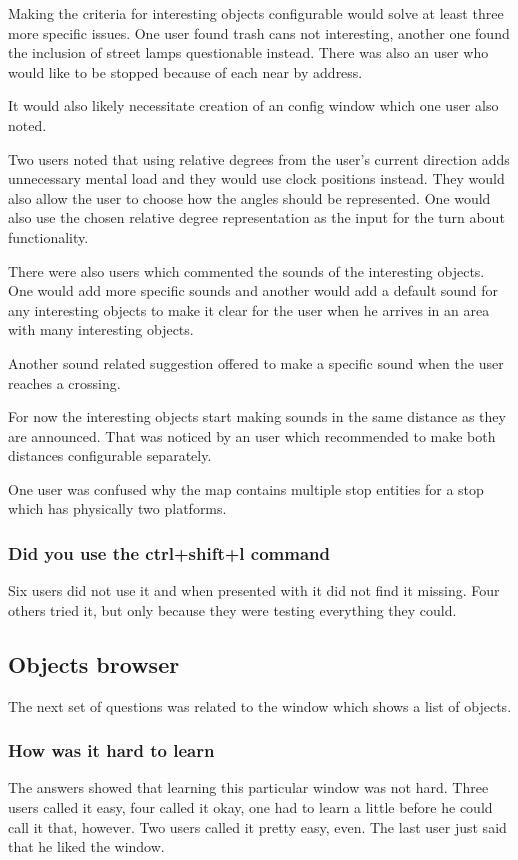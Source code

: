 \documentclass[nolof,digital]{fithesis3}
\begin{document}
Making the criteria for interesting objects configurable would solve at least three more specific issues. One user found trash cans not interesting, another one found the inclusion of street lamps questionable instead. There was also an user who would like to be stopped because of each near by address.

It would also likely necessitate creation of an config window which one user also noted.

Two users noted that using relative degrees from the user's current direction adds unnecessary mental load and they would use clock positions instead. They would also allow the user to choose how the angles should be represented. One would also use the chosen relative degree representation as the input for the turn about functionality.

There were also users which commented the sounds of the interesting objects. One would add more specific sounds and another would add a default sound for any interesting objects to make it clear for the user when he arrives in an area with many interesting objects.

Another sound related suggestion offered to make a specific sound when the user reaches a crossing.

For now the interesting objects start making sounds in the same distance as they are announced. That was noticed by an user which recommended to make both distances configurable separately.

One  user was confused why the map contains multiple stop entities for a stop which has physically two platforms.
\subsubsection{Did you use the ctrl+shift+l command}
Six users did not use it and when presented with it did not find it missing. Four others tried it, but only because they were testing everything they could.
\subsection{Objects browser}
The next set of questions was related to the window which shows a list of objects.
\subsubsection{How was it hard to learn}
The answers showed that learning this particular window was not hard. Three users called it easy, four called it okay, one had to learn a little before he could call it that, however. Two users called it pretty easy, even. The last user just said that he liked the window.
\end{document}

